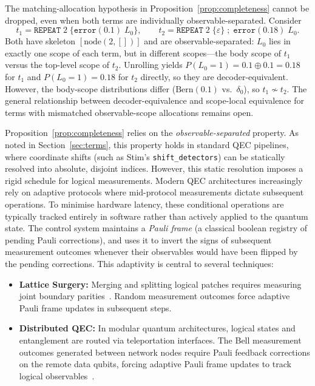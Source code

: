 \documentclass[11pt,a4paper]{article}
\newcommand{\bern}{\mathrm{Bern}}     %
\begin{document}
The matching-allocation hypothesis in Proposition~\ref{prop:completeness} cannot be dropped, even when both terms are individually observable-separated. Consider
\[
  t_1 = \mathtt{REPEAT}\;2\;\{\mathtt{error}(0.1)\;L_0\},
  \qquad
  t_2 = \mathtt{REPEAT}\;2\;\{\varepsilon\}\;;\;\mathtt{error}(0.18)\;L_0.
\]
Both have skeleton $[\mathrm{node}(2,[])]$ and are observable-separated: $L_0$ lies in exactly one scope of each term, but in different scopes---the body scope of $t_1$ versus the top-level scope of $t_2$. Unrolling yields $P(L_0=1) = 0.1\oplus 0.1 = 0.18$ for $t_1$ and $P(L_0=1) = 0.18$ for $t_2$ directly, so they are decoder-equivalent. However, the body-scope distributions differ ($\bern(0.1)$ vs.\ $\delta_0$), so $t_1\not\sim t_2$. The general relationship between decoder-equivalence and scope-local equivalence for terms with mismatched observable-scope allocations remains open.

Proposition~\ref{prop:completeness} relies on the \emph{observable-separated} property. As noted in Section~\ref{sec:terms}, this property holds in standard QEC pipelines, where coordinate shifts (such as Stim's \texttt{shift\_detectors}) can be statically resolved into absolute, disjoint indices. However, this static resolution imposes a rigid schedule for logical measurements. Modern QEC architectures increasingly rely on adaptive protocols where mid-protocol measurements dictate subsequent operations. To minimise hardware latency, these conditional operations are typically tracked entirely in software rather than actively applied to the quantum state. The control system maintains a \emph{Pauli frame} (a classical boolean registry of pending Pauli corrections), and uses it to invert the signs of subsequent measurement outcomes whenever their observables would have been flipped by the pending corrections. This adaptivity is central to several techniques:

\begin{itemize}
    \item \textbf{Lattice Surgery:} Merging and splitting logical patches requires measuring joint boundary parities~\cite{horsman2012latticesurgery,litinski2019lattice}. Random measurement outcomes force adaptive Pauli frame updates in subsequent steps.
    \item \textbf{Distributed QEC:} In modular quantum architectures, logical states and entanglement are routed via teleportation interfaces. The Bell measurement outcomes generated between network nodes require Pauli feedback corrections on the remote data qubits, forcing adaptive Pauli frame updates to track logical observables~\cite{xuetal2022,sutcliffe2026,shalby2025,jacinto2026}.
\end{itemize}
\end{document}
